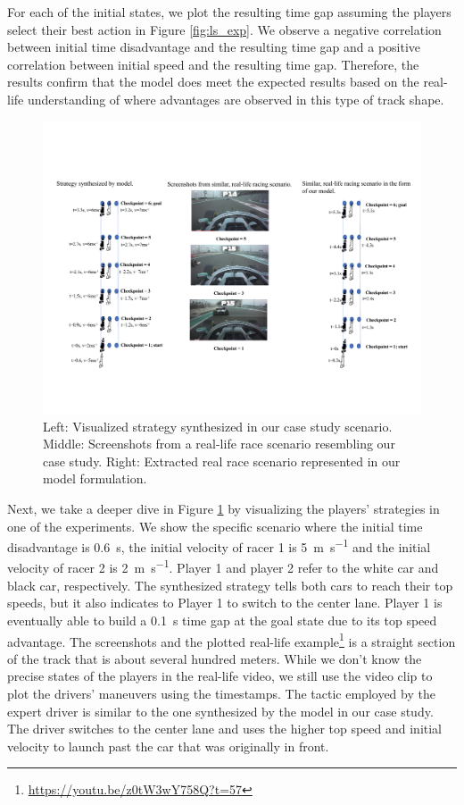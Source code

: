 For each of the initial states, we plot the resulting time gap assuming the players select their best action in Figure \ref{fig:ls_exp}. We observe a negative correlation between initial time disadvantage and the resulting time gap and a positive correlation between initial speed and the resulting time gap. Therefore, the results confirm that the model does meet the expected results based on the real-life understanding of where advantages are observed in this type of track shape. 
\begin{figure}
\includegraphics[height=0.8\textwidth, width=\textheight]{Figures/StraightViz.pdf}
    \caption[Synthesized strategy compared to real-life scenario on a long straight.] { Left: Visualized strategy synthesized in our case study scenario. Middle: Screenshots from a real-life race scenario resembling our case study.  Right: Extracted real race scenario represented in our model formulation.}
    \label{fig:ls}
\end{figure}
Next, we take a deeper dive in Figure \ref{fig:ls} by visualizing the players' strategies in one of the experiments. We show the specific scenario where the initial time disadvantage is \SI{0.6}{\second}, the initial velocity of racer 1 is \SI{5}{\meter\per\second} and the initial velocity of racer 2 is \SI{2}{\meter\per\second}. Player 1 and player 2 refer to the white car and black car, respectively. The synthesized strategy tells both cars to reach their top speeds, but it also indicates to Player 1 to switch to the center lane. Player 1 is eventually able to build a \SI{0.1}{\second} time gap at the goal state due to its top speed advantage. The screenshots and the plotted real-life example\footnote{\label{straightnote}\url{https://youtu.be/z0tW3wY758Q?t=57}} is a straight section of the track that is about several hundred meters. While we don't know the precise states of the players in the real-life video, we still use the video clip to plot the drivers' maneuvers using the timestamps. The tactic employed by the expert driver is similar to the one synthesized by the model in our case study. The driver switches to the center lane and uses the higher top speed and initial velocity to launch past the car that was originally in front. 

